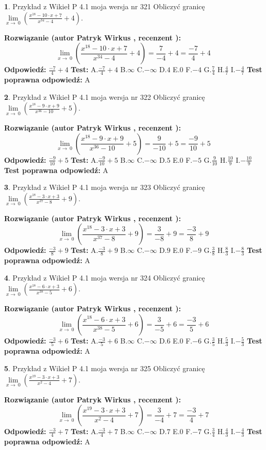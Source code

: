 \documentclass[12pt, a4paper]{article}
\theoremstyle{definition} %
\newtheorem{zad}{}
\newcommand{\zadStart}[1]{\begin{zad}#1\newline}
\newcommand{\zadStop}{\end{zad}}
\newcommand{\rozwStart}[2]{\noindent \textbf{Rozwiązanie (autor #1 , recenzent #2): }\newline}
\newcommand{\rozwStop}{\newline}
\newcommand{\odpStart}{\noindent \textbf{Odpowiedź:}\newline}
\newcommand{\odpStop}{\newline}
\newcommand{\testStart}{\noindent \textbf{Test:}\newline}
\newcommand{\testStop}{\newline}
\newcommand{\kluczStart}{\noindent \textbf{Test poprawna odpowiedź:}\newline}
\newcommand{\kluczStop}{\newline}
\begin{document}
\zadStart{Przykład z Wikieł P 4.1 moja wersja nr 321}
Obliczyć granicę $\lim\limits_{x\to\ 0}(\frac{x^{18}-10 \cdot x +7}{x^{34}-4}+4)$.
\zadStop
\rozwStart{Patryk Wirkus}{}
$$\lim\limits_{x\to\ 0}(\frac{x^{18}-10 \cdot x +7}{x^{34}-4}+4)=\frac{7}{-4}+4=\frac{-7}{4}+4$$
\rozwStop
\odpStart
$\frac{-7}{4}+4$
\odpStop
\testStart
A.$\frac{-7}{4}+4$
B.$\infty$
C.$-\infty$
D.$4$
E.$0$
F.$-4$
G.$\frac{7}{4}$
H.$\frac{4}{7}$
I.$-\frac{4}{7}$
\testStop
\kluczStart
A
\kluczStop



\zadStart{Przykład z Wikieł P 4.1 moja wersja nr 322}
Obliczyć granicę $\lim\limits_{x\to\ 0}(\frac{x^{18}-9 \cdot x +9}{x^{36}-10}+5)$.
\zadStop
\rozwStart{Patryk Wirkus}{}
$$\lim\limits_{x\to\ 0}(\frac{x^{18}-9 \cdot x +9}{x^{36}-10}+5)=\frac{9}{-10}+5=\frac{-9}{10}+5$$
\rozwStop
\odpStart
$\frac{-9}{10}+5$
\odpStop
\testStart
A.$\frac{-9}{10}+5$
B.$\infty$
C.$-\infty$
D.$5$
E.$0$
F.$-5$
G.$\frac{9}{10}$
H.$\frac{10}{9}$
I.$-\frac{10}{9}$
\testStop
\kluczStart
A
\kluczStop



\zadStart{Przykład z Wikieł P 4.1 moja wersja nr 323}
Obliczyć granicę $\lim\limits_{x\to\ 0}(\frac{x^{18}-3 \cdot x +3}{x^{37}-8}+9)$.
\zadStop
\rozwStart{Patryk Wirkus}{}
$$\lim\limits_{x\to\ 0}(\frac{x^{18}-3 \cdot x +3}{x^{37}-8}+9)=\frac{3}{-8}+9=\frac{-3}{8}+9$$
\rozwStop
\odpStart
$\frac{-3}{8}+9$
\odpStop
\testStart
A.$\frac{-3}{8}+9$
B.$\infty$
C.$-\infty$
D.$9$
E.$0$
F.$-9$
G.$\frac{3}{8}$
H.$\frac{8}{3}$
I.$-\frac{8}{3}$
\testStop
\kluczStart
A
\kluczStop



\zadStart{Przykład z Wikieł P 4.1 moja wersja nr 324}
Obliczyć granicę $\lim\limits_{x\to\ 0}(\frac{x^{18}-6 \cdot x +3}{x^{38}-5}+6)$.
\zadStop
\rozwStart{Patryk Wirkus}{}
$$\lim\limits_{x\to\ 0}(\frac{x^{18}-6 \cdot x +3}{x^{38}-5}+6)=\frac{3}{-5}+6=\frac{-3}{5}+6$$
\rozwStop
\odpStart
$\frac{-3}{5}+6$
\odpStop
\testStart
A.$\frac{-3}{5}+6$
B.$\infty$
C.$-\infty$
D.$6$
E.$0$
F.$-6$
G.$\frac{3}{5}$
H.$\frac{5}{3}$
I.$-\frac{5}{3}$
\testStop
\kluczStart
A
\kluczStop



\zadStart{Przykład z Wikieł P 4.1 moja wersja nr 325}
Obliczyć granicę $\lim\limits_{x\to\ 0}(\frac{x^{19}-3 \cdot x +3}{x^{2}-4}+7)$.
\zadStop
\rozwStart{Patryk Wirkus}{}
$$\lim\limits_{x\to\ 0}(\frac{x^{19}-3 \cdot x +3}{x^{2}-4}+7)=\frac{3}{-4}+7=\frac{-3}{4}+7$$
\rozwStop
\odpStart
$\frac{-3}{4}+7$
\odpStop
\testStart
A.$\frac{-3}{4}+7$
B.$\infty$
C.$-\infty$
D.$7$
E.$0$
F.$-7$
G.$\frac{3}{4}$
H.$\frac{4}{3}$
I.$-\frac{4}{3}$
\testStop
\kluczStart
A
\kluczStop
\end{document}
